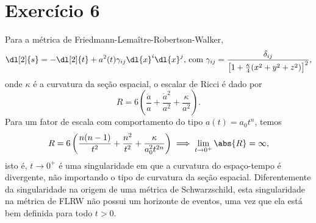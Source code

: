 \section*{Exercício 6}
Para a métrica de Friedmann-Lemaître-Robertson-Walker,
\begin{equation*}
    \dl[2]{s} = -\dl[2]{t} + a^2(t) \gamma_{ij} \dl{x}^i\dl{x}^j\text{, com }\gamma_{ij} = \frac{\delta_{ij}}{\left[1 + \frac{\kappa}4(x^2 + y^2 + z^2)\right]^2},
\end{equation*}
onde \(\kappa\) é a curvatura da seção espacial, o escalar de Ricci é dado por
\begin{equation*}
    R = 6\left(\frac{\ddot{a}}{a} + \frac{\dot{a}^2}{a^2} + \frac{\kappa}{a^2}\right).
\end{equation*}
Para um fator de escala com comportamento do tipo \(a(t) = a_0t^n\), temos
\begin{equation*}
    R = 6 \left(\frac{n(n-1)}{t^2} + \frac{n^2}{t^2} + \frac{\kappa}{a_0^2t^{2n}}\right) \implies \lim_{t \to 0^+} \abs{R} = \infty,
\end{equation*}
isto é, \(t \to 0^+\) é uma singularidade em que a curvatura do espaço-tempo é divergente, não importando o tipo de curvatura da seção espacial. Diferentemente da singularidade na origem de uma métrica de Schwarzschild, esta singularidade na métrica de FLRW não possui um horizonte de eventos, uma vez que ela está bem definida para todo \(t > 0\).
